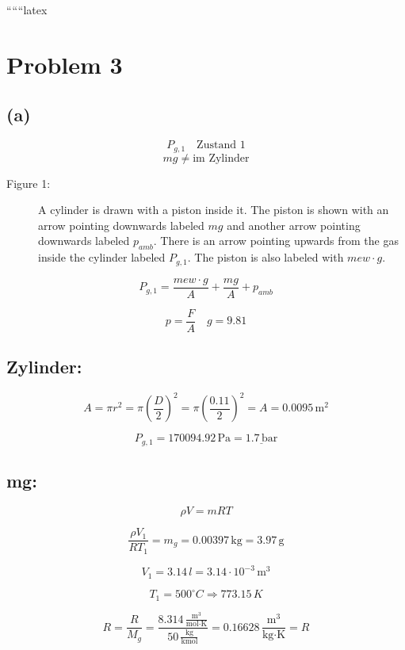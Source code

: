 
``````latex


\section*{Problem 3}

\subsection*{(a)}

\[
P_{g,1} \quad \text{Zustand 1}
\]
\[
mg \neq \text{im Zylinder}
\]

\begin{description}
    \item[Figure 1:] A cylinder is drawn with a piston inside it. The piston is shown with an arrow pointing downwards labeled \( mg \) and another arrow pointing downwards labeled \( p_{amb} \). There is an arrow pointing upwards from the gas inside the cylinder labeled \( P_{g,1} \). The piston is also labeled with \( mew \cdot g \).
\end{description}

\[
P_{g,1} = \frac{mew \cdot g}{A} + \frac{mg}{A} + p_{amb}
\]

\[
p = \frac{F}{A} \quad g = 9.81
\]

\subsection*{Zylinder:}

\[
A = \pi r^2 = \pi \left( \frac{D}{2} \right)^2 = \pi \left( \frac{0.11}{2} \right)^2 = A = 0.0095 \, \text{m}^2
\]

\[
P_{g,1} = 170094.92 \, \text{Pa} = \underline{1.7 \, \text{bar}}
\]

\subsection*{mg:}

\[
\rho V = mRT
\]

\[
\frac{\rho V_1}{RT_1} = m_g = 0.00397 \, \text{kg} = 3.97 \, \text{g}
\]

\[
V_1 = 3.14 \, l = 3.14 \cdot 10^{-3} \, \text{m}^3
\]

\[
T_1 = 500^\circ C \Rightarrow 773.15 \, K
\]

\[
R = \frac{R}{M_g} = \frac{8.314 \, \frac{\text{m}^3}{\text{mol} \cdot \text{K}}}{50 \, \frac{\text{kg}}{\text{kmol}}} = 0.16628 \, \frac{\text{m}^3}{\text{kg} \cdot \text{K}} = R
\]

